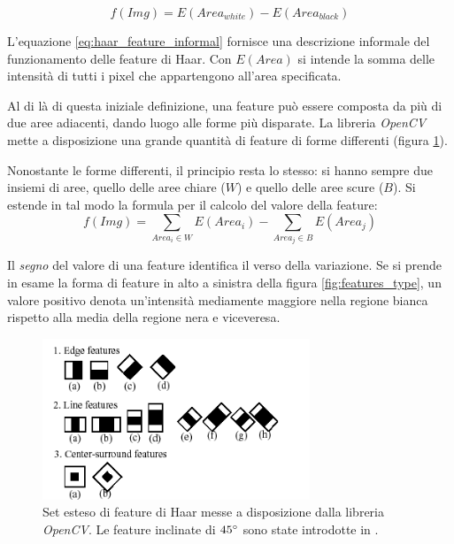         \begin{equation}
            \label{eq:haar_feature_informal}
            f(Img) = E(Area_{white}) - E(Area_{black})
        \end{equation}

        L'equazione \ref{eq:haar_feature_informal} fornisce una descrizione informale del funzionamento delle feature di Haar. Con $E(Area)$ si intende la somma delle intensità di tutti i pixel che appartengono all'area specificata.

        Al di là di questa iniziale definizione, una feature può essere composta da più di due aree adiacenti, dando luogo alle forme più disparate.
        La libreria \emph{OpenCV} mette a disposizione una grande quantità di feature di forme differenti (figura \ref{fig:opencv_haar_features}).

        Nonostante le forme differenti, il principio resta lo stesso: si hanno sempre due insiemi di aree, quello delle aree chiare ($W$) e quello delle aree scure ($B$).
        Si estende in tal modo la formula per il calcolo del valore della feature:
        \begin{equation}
            \label{eq;haar_feature_general}
            f(Img) = \sum_{Area_i \in W}E(Area_i) - \sum_{Area_j \in B}E(Area_j) 
        \end{equation}

        Il \emph{segno} del valore di una feature identifica il verso della variazione. Se si prende in esame la forma di feature in alto a sinistra della figura \ref{fig:features_type}, un valore positivo denota un'intensità mediamente maggiore nella regione bianca rispetto alla media della regione nera e viceveresa.

        \begin{figure}
            \centering
            \includegraphics[width=8cm]{img/open_cv_haar_features.png}
            \caption{Set esteso di feature di Haar messe a disposizione dalla libreria \emph{OpenCV}. 
            Le feature inclinate di $45 \degree$ sono state introdotte in \cite{Lienhart02}.}
            \label{fig:opencv_haar_features}
        \end{figure}


